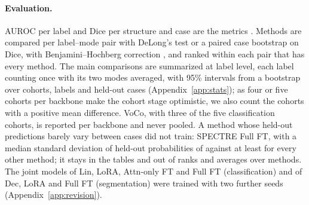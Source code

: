 \paragraph{Evaluation.} AUROC per label and Dice per structure and case are the metrics \citep{maierhein2024metrics}. Methods are compared per label--mode pair with DeLong's test \citep{delong1988} or a paired case bootstrap on Dice, with Benjamini--Hochberg correction \citep{benjamini1995fdr}, and ranked within each pair that has every method. The main comparisons are summarized at label level, each label counting once with its two modes averaged, with 95\% intervals from a bootstrap over cohorts, labels and held-out cases (Appendix~\ref{app:stats}); as four or five cohorts per backbone make the cohort stage optimistic, we also count the cohorts with a positive mean difference. VoCo, with three of the five classification cohorts, is reported per backbone and never pooled. A method whose held-out predictions barely vary between cases did not train: SPECTRE Full FT, with a median standard deviation of held-out probabilities of \numSpreadSpectreFullft{} against at least \numSpreadOthermin{} for every other method; it stays in the tables and out of ranks and averages over methods. The joint models of Lin, LoRA, Attn-only FT and Full FT (classification) and of Dec, LoRA and Full FT (segmentation) were trained with two further seeds (Appendix~\ref{app:revision}).
